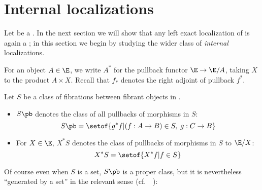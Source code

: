 \section{Internal localizations}
\label{sec:int-loc}

Let \E be a \ttmt.
In the next section we will show that any left exact localization of \E is again a \ttmt; in this section we begin by studying the wider class of \emph{internal} localizations.

For an object $A\in\E$, we write $A^*$ for the pullback functor $\E \to \E/A$, taking $X$ to the product $A\times X$.
Recall that $f_*$ denotes the right adjoint of pullback $f^*$.

\begin{defn}
  Let $S$ be a class of fibrations between fibrant objects in \E.
  \begin{itemize}
  \item $S\pb$ denotes the class of all pullbacks of morphisms in $S$:
    \[ S\pb = \setof{ g^*f | (f:A\to B)\in S,\; g:C\to B } \]
  \item For $X\in\E$, $X^*S$ denotes the class of pullbacks of morphisms in $S$ to $\E/X$:
    \[ X^*S = \setof{ X^*f | f\in S} \]
  \end{itemize}
\end{defn}

Of course even when $S$ is a set, $S\pb$ is a proper class, but it is nevertheless ``generated by a set'' in the relevant sense (cf.~~\cite[Proposition 6.2.1.2]{lurie:higher-topoi}):

